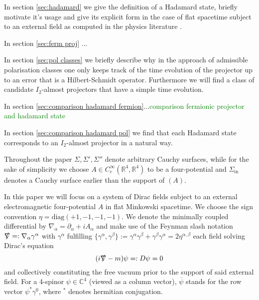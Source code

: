 \documentclass[b5paper,draft,openbib,12pt]{memoir}
\begin{document}
In section \ref{sec:hadamard} we give the definition of a Hadamard state, briefly motivate it's usage 
and give its explicit form in the case of flat spacetime subject to an external field as computed in the physics literature \cite{schlemmer2015current}.

In section \ref{sec:ferm proj} ...

In section \ref{sec:pol classes} we briefly describe why in the approach of admissible polarisation classes one only keeps track of the time
evolution of the projector up to an error that is a Hilbert-Schmidt operator. Furthermore we will find a class of candidate \(I_2\)-almost projectors
that have a simple time evolution.

In section \ref{sec:comparison hadamard fermion}...\textcolor{green}{comparison fermionic projector and hadamard state}

In section \ref{sec:comparison hadamard pol} we find that each Hadamard state corresponds to an \(I_2\)-almost projector in a natural way.

Throughout the paper
\(\Sigma, \Sigma', \Sigma''\) denote arbitrary Cauchy surfaces, while for the sake of simplicity we choose \(A\in C_c^\infty(\mathbb{R}^4,\mathbb{R}^4)\) 
to be a four-potential and \(\Sigma_{\text{in}}\) denotes a Cauchy surface earlier than the support of \((A)\).

In this paper we will focus on a system of Dirac fields subject to an external electromagnetic four-potential \(A\) in flat Minkowski spacetime.
We choose the sign convention \(\eta=\text{diag}(+1,-1,-1,-1)\). We denote the minimally coupled differential by \(\nabla_{\alpha} = \partial_{\alpha} + i A_{\alpha}\)
and make use of the Feynman slash notation \(\slashed{\nabla}=:\nabla_{\alpha}\gamma^\alpha\) with \(\gamma^\alpha\) fulfilling 
\(\{\gamma^\alpha , \gamma^\beta\}:=\gamma^\alpha  \gamma^\beta+\gamma^\beta  \gamma^\alpha  = 2 \eta^{\alpha,\beta}\)  each field solving 
Dirac's equation
\begin{equation}\label{dirac}
(i\slashed{\nabla}-m)\psi =: D\psi= 0
\end{equation}
and collectively constituting the free vacuum prior to the support of said external field.
For a 4-spinor \(\psi\in\mathbb{C}^4\) (viewed as a column vector), \(\overline{\psi}\) stands for the row vector \(\psi^*\gamma^0\), where \({}^*\) denotes hermitian conjugation.
\end{document}
